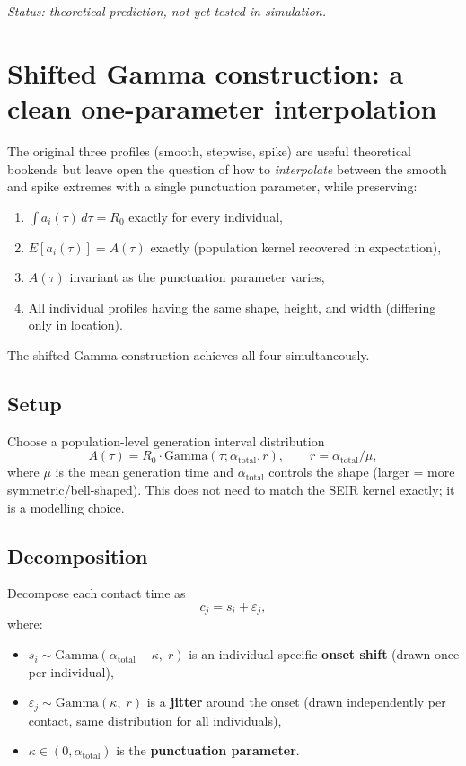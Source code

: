 \documentclass[11pt]{article}
\begin{document}
\textit{Status: theoretical prediction, not yet tested in simulation.}

\section{Shifted Gamma construction: a clean one-parameter interpolation}

The original three profiles (smooth, stepwise, spike) are useful theoretical bookends but leave open the question of how to \textit{interpolate} between the smooth and spike extremes with a single punctuation parameter, while preserving:

\begin{enumerate}
\item $\int a_i(\tau)\,d\tau = R_0$ exactly for every individual,
\item $E[a_i(\tau)] = A(\tau)$ exactly (population kernel recovered in expectation),
\item $A(\tau)$ invariant as the punctuation parameter varies,
\item All individual profiles having the same shape, height, and width (differing only in location).
\end{enumerate}

The shifted Gamma construction achieves all four simultaneously.

\subsection{Setup}

Choose a population-level generation interval distribution
\[
A(\tau) = R_0 \cdot \text{Gamma}(\tau; \alpha_{\text{total}}, r), \qquad r = \alpha_{\text{total}} / \mu,
\]
where $\mu$ is the mean generation time and $\alpha_{\text{total}}$ controls the shape (larger = more symmetric/bell-shaped). This does not need to match the SEIR kernel exactly; it is a modelling choice.

\subsection{Decomposition}

Decompose each contact time as
\[
c_j = s_i + \varepsilon_j,
\]
where:
\begin{itemize}
\item $s_i \sim \text{Gamma}(\alpha_{\text{total}} - \kappa,\; r)$ is an individual-specific \textbf{onset shift} (drawn once per individual),
\item $\varepsilon_j \sim \text{Gamma}(\kappa,\; r)$ is a \textbf{jitter} around the onset (drawn independently per contact, same distribution for all individuals),
\item $\kappa \in (0, \alpha_{\text{total}})$ is the \textbf{punctuation parameter}.
\end{itemize}
\end{document}
